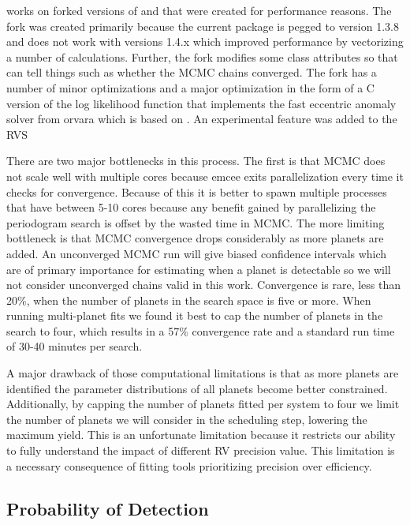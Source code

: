  works on forked versions of  and  that were created
for performance reasons. The  fork was created primarily because the
current  package is pegged to  version 1.3.8 and does not work
with  versions 1.4.x which improved performance by vectorizing a number
of calculations. Further, the fork modifies some class attributes so that
 can tell things such as whether the MCMC chains converged. The
 fork has a number of minor optimizations and a major optimization in the
form of a C version of the log likelihood function that implements the fast
eccentric anomaly solver from orvara \citep{brandtOrvaraEfficient2021} which is
based on \citet{raposo-pulidoEfficientCode2017}. An experimental feature was
added to the RVS

There are two major bottlenecks in this process. The first is that MCMC does
not scale well with multiple cores because emcee exits parallelization every
time it checks for convergence. Because of this it is better to spawn multiple
processes that have between 5-10 cores because any benefit gained by
parallelizing the periodogram search is offset by the wasted time in MCMC. The
more limiting bottleneck is that MCMC convergence drops considerably as more
planets are added. An unconverged MCMC run will give biased confidence
intervals which are of primary importance for estimating when a planet is
detectable so we will not consider unconverged chains valid in this work.
Convergence is rare, less than 20\%, when the number of planets in the search
space is five or more. When running multi-planet fits we found it best to cap
the number of planets in the search to four, which results in a 57\%
convergence rate and a standard run time of 30-40 minutes per search.

A major drawback of those computational limitations is that as more planets are
identified the parameter distributions of all planets become better
constrained. Additionally, by capping the number of planets fitted per system
to four we limit the number of planets we will consider in the scheduling step,
lowering the maximum yield. This is an unfortunate limitation because it restricts
our ability to fully understand the impact of different RV precision value.
This limitation is a necessary consequence of fitting tools prioritizing
precision over efficiency.

\subsection{Probability of Detection}

